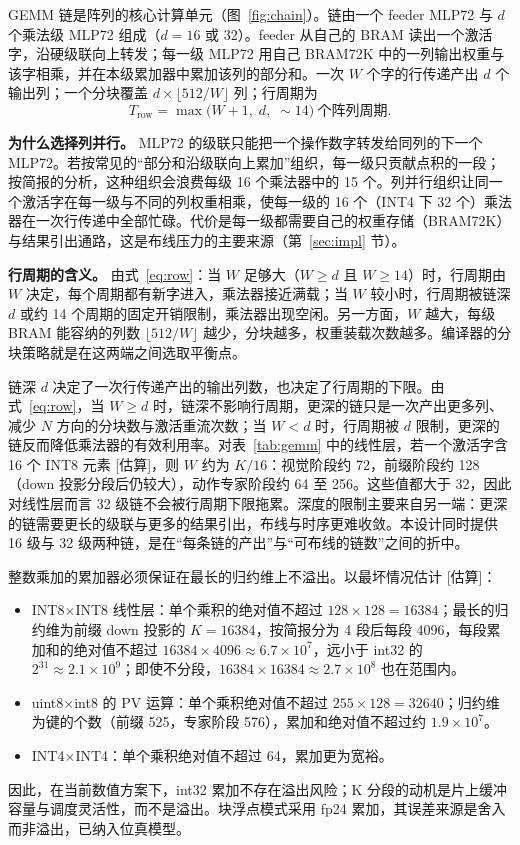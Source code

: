 \documentclass[a4paper,10.5pt]{ctexart}
\newcommand{\tE}{\textsf{[估算]}}           %
\begin{document}
GEMM 链是阵列的核心计算单元（图~\ref{fig:chain}）。链由一个 feeder MLP72 与 $d$ 个乘法级 MLP72 组成（$d=16$ 或 32）。feeder 从自己的 BRAM 读出一个激活字，沿硬级联向上转发；每一级 MLP72 用自己 BRAM72K 中的一列输出权重与该字相乘，并在本级累加器中累加该列的部分和。一次 $W$ 个字的行传递产出 $d$ 个输出列；一个分块覆盖 $d\times\lfloor512/W\rfloor$ 列；行周期为
\begin{equation}
  T_{\text{row}} = \max\bigl(W+1,\; d,\; \sim\!14\bigr)\ \text{个阵列周期}.
  \label{eq:row}
\end{equation}

\textbf{为什么选择列并行。} MLP72 的级联只能把一个操作数字转发给同列的下一个 MLP72。若按常见的“部分和沿级联向上累加”组织，每一级只贡献点积的一段；按简报的分析，这种组织会浪费每级 16 个乘法器中的 15 个。列并行组织让同一个激活字在每一级与不同的列权重相乘，使每一级的 16 个（INT4 下 32 个）乘法器在一次行传递中全部忙碌。代价是每一级都需要自己的权重存储（BRAM72K）与结果引出通路，这是布线压力的主要来源（第~\ref{sec:impl} 节）。

\textbf{行周期的含义。} 由式~\eqref{eq:row}：当 $W$ 足够大（$W\ge d$ 且 $W\ge14$）时，行周期由 $W$ 决定，每个周期都有新字进入，乘法器接近满载；当 $W$ 较小时，行周期被链深 $d$ 或约 14 个周期的固定开销限制，乘法器出现空闲。另一方面，$W$ 越大，每级 BRAM 能容纳的列数 $\lfloor512/W\rfloor$ 越少，分块越多，权重装载次数越多。编译器的分块策略就是在这两端之间选取平衡点。

链深 $d$ 决定了一次行传递产出的输出列数，也决定了行周期的下限。由式~\eqref{eq:row}，当 $W\ge d$ 时，链深不影响行周期，更深的链只是一次产出更多列、减少 $N$ 方向的分块数与激活重流次数；当 $W<d$ 时，行周期被 $d$ 限制，更深的链反而降低乘法器的有效利用率。对表~\ref{tab:gemm} 中的线性层，若一个激活字含 16 个 INT8 元素 \tE，则 $W$ 约为 $K/16$：视觉阶段约 72，前缀阶段约 128（down 投影分段后仍较大），动作专家阶段约 64 至 256。这些值都大于 32，因此对线性层而言 32 级链不会被行周期下限拖累。深度的限制主要来自另一端：更深的链需要更长的级联与更多的结果引出，布线与时序更难收敛。本设计同时提供 16 级与 32 级两种链，是在“每条链的产出”与“可布线的链数”之间的折中。

整数乘加的累加器必须保证在最长的归约维上不溢出。以最坏情况估计 \tE：
\begin{itemize}
  \item INT8$\times$INT8 线性层：单个乘积的绝对值不超过 $128\times128=16384$；最长的归约维为前缀 down 投影的 $K=16384$，按简报分为 4 段后每段 4096，每段累加和的绝对值不超过 $16384\times4096\approx6.7\times10^7$，远小于 int32 的 $2^{31}\approx2.1\times10^9$；即使不分段，$16384\times16384\approx2.7\times10^8$ 也在范围内。
  \item uint8$\times$int8 的 PV 运算：单个乘积绝对值不超过 $255\times128=32640$；归约维为键的个数（前缀 525，专家阶段 576），累加和绝对值不超过约 $1.9\times10^7$。
  \item INT4$\times$INT4：单个乘积绝对值不超过 64，累加更为宽裕。
\end{itemize}
因此，在当前数值方案下，int32 累加不存在溢出风险；K 分段的动机是片上缓冲容量与调度灵活性，而不是溢出。块浮点模式采用 fp24 累加，其误差来源是舍入而非溢出，已纳入位真模型。
\end{document}
